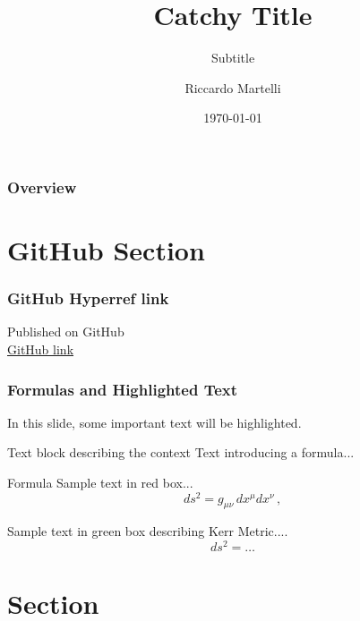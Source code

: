 \documentclass[aspectratio=169,xcolor=dvipsnames]{beamer}
\title{Catchy Title}
\subtitle{Subtitle}
\author{Riccardo Martelli}
\institute
{Institutions}
\date{\today}
\begin{document}
\begin{frame}
    \titlepage
\end{frame}

\begin{frame}
\frametitle{Overview}
    \tableofcontents
\end{frame}

\section{GitHub Section}

\begin{frame}
\frametitle{GitHub Hyperref link}
\centering
    \Huge Published on GitHub\\
    \href{https://github.com/Riccardo-Martelli/NovaBeamer-Theme}{\faGithub GitHub link}
\end{frame}


\begin{frame}
\frametitle{Formulas and Highlighted Text}

    In this slide, some important text will be \alert{highlighted}.

    \begin{block}{Text block describing the context}
        Text introducing a formula...
    \end{block}

    \begin{alertblock}{Formula}
        Sample text in red box...
        \[ds^2 = g_{\mu\nu}\, dx^\mu dx^\nu\,,\]
    \end{alertblock}

    \begin{examples}
        Sample text in green box describing Kerr Metric....
        \[ds^2 = \dots\]
    \end{examples}

    
\end{frame}


\section{Section}
\end{document}
